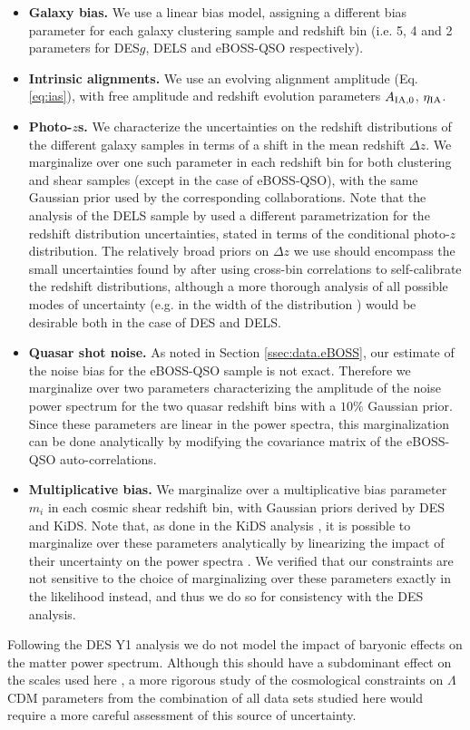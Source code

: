 \documentclass[a4paper,11pt]{article}
\newcommand{\lcdm}{$\Lambda$CDM\xspace}
\newcommand{\des}{DES\xspace}
\newcommand{\kids}{KiDS\xspace}
\newcommand{\eboss}{eBOSS-QSO\xspace}
\newcommand{\dls}{DELS\xspace}
\begin{document}
      \begin{itemize}
        \item {\bf Galaxy bias.} We use a linear bias model, assigning a different bias parameter for each galaxy clustering sample and redshift bin (i.e. 5, 4 and 2 parameters for DES$g$, \dls and \eboss respectively).
        \item {\bf Intrinsic alignments.} We use an evolving alignment amplitude (Eq. \ref{eq:ias}), with free amplitude and redshift evolution parameters $A_{\rm IA,0}$, $\eta_{\rm IA}$.
        \item {\bf Photo-$z$s.} We characterize the uncertainties on the redshift distributions of the different galaxy samples in terms of a shift in the mean redshift $\Delta z$. We marginalize over one such parameter in each redshift bin for both clustering and shear samples (except in the case of \eboss), with the same Gaussian prior used by the corresponding collaborations. Note that the analysis of the \dls sample by \cite{2010.00466} used a different parametrization for the redshift distribution uncertainties, stated in terms of the conditional photo-$z$ distribution. The relatively broad priors on $\Delta z$ we use should encompass the small uncertainties found by \cite{2010.00466} after using cross-bin correlations to self-calibrate the redshift distributions, although a more thorough analysis of all possible modes of uncertainty (e.g. in the width of the distribution \cite{1912.08209}) would be desirable both in the case of \des and \dls.
        \item {\bf Quasar shot noise.} As noted in Section \ref{ssec:data.eBOSS}, our estimate of the noise bias for the \eboss sample is not exact. Therefore we marginalize over two parameters characterizing the amplitude of the noise power spectrum for the two quasar redshift bins with a $10\%$ Gaussian prior. Since these parameters are linear in the power spectra, this marginalization can be done analytically by modifying the covariance matrix of the \eboss auto-correlations.
        \item {\bf Multiplicative bias.} We marginalize over a multiplicative bias parameter $m_i$ in each cosmic shear redshift bin, with Gaussian priors derived by \des and \kids. Note that, as done in the \kids analysis \cite{2007.15633}, it is possible to marginalize over these parameters analytically by linearizing the impact of their uncertainty on the power spectra \cite{1606.05338}. We verified that our constraints are not sensitive to the choice of marginalizing over these parameters exactly in the likelihood instead, and thus we do so for consistency with the \des analysis.
      \end{itemize}
      Following the \des Y1 analysis we do not model the impact of baryonic effects on the matter power spectrum. Although this should have a subdominant effect on the scales used here \cite{1809.09148,2007.15632}, a more rigorous study of the cosmological constraints on \lcdm parameters from the combination of all data sets studied here would require a more careful assessment of this source of uncertainty.
      
\end{document}
